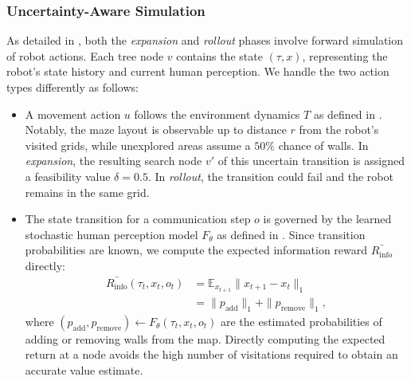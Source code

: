 \subsubsection{Uncertainty-Aware Simulation}
As detailed in , both the \emph{expansion} and \emph{rollout} phases involve forward simulation of robot actions. Each tree node $v$ contains the state $(\tau, x)$, representing the robot's state history and current human perception. We handle the two action types differently as follows:
\begin{itemize}
    \item A movement action $u$ follows the environment dynamics $T$ as defined in . Notably, the maze layout is observable up to distance $r$ from the robot's visited grids, while unexplored areas assume a $50\%$ chance of walls. In \emph{expansion}, the resulting search node $v'$ of this uncertain transition is assigned a feasibility value $\delta = 0.5$. In \emph{rollout}, the transition could fail and the robot remains in the same grid.
    
    \item The state transition for a communication step $o$ is governed by the learned stochastic human perception model $F_\theta$ as defined in . Since transition probabilities are known, we compute the expected information reward $\bar{R_\mathrm{info}}$ directly:
    \begin{align*}
        \bar{R_\mathrm{info}}(\tau_t, x_t, o_t) &= \mathbb{E}_{x_{t+1}}\|x_{t+1}-x_t\|_1 \\
        &= \|p_\mathrm{add}\|_1 + \|p_\mathrm{remove}\|_1,
    \end{align*}
    where $(p_\mathrm{add}, p_\mathrm{remove}) \gets F_\theta(\tau_t, x_t, o_t)$ are the estimated probabilities of adding or removing walls from the map. 
    Directly computing the expected return at a node avoids the high number of visitations required to obtain an accurate value estimate.
\end{itemize}



